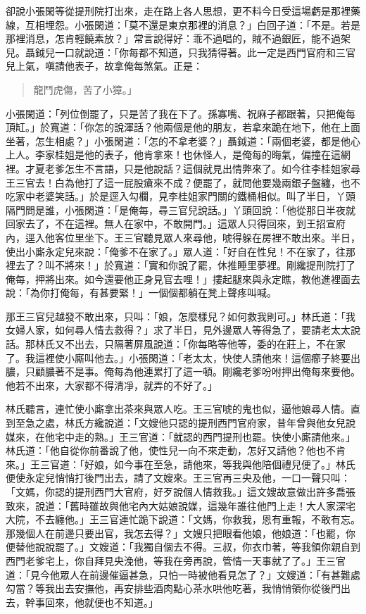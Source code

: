 卻說小張閑等從提刑院打出來，走在路上各人思想，更不料今日受這場虧是那裡藥線，互相埋怨。小張閑道：「莫不還是東京那裡的消息？」白回子道：「不是。若是那裡消息，怎肯輕饒素放？」常言說得好：乖不過唱的，賊不過銀匠，能不過架兒。聶鉞兒一口就說道：「你每都不知道，只我猜得著。此一定是西門官府和三官兒上氣，嗔請他表子，故拿俺每煞氣。正是：
\begin{quote}
龍鬥虎傷，苦了小獐。」
\end{quote}小張閑道：「列位倒罷了，只是苦了我在下了。孫寡嘴、祝麻子都跟著，只把俺每頂缸。」於寬道：「你怎的說渾話？他兩個是他的朋友，若拿來跪在地下，他在上面坐著，怎生相處？」小張閑道：「怎的不拿老婆？」聶鉞道：「兩個老婆，都是他心上人。李家桂姐是他的表子，他肯拿來！也休怪人，是俺每的晦氣，偏撞在這網裡。才夏老爹怎生不言語，只是他說話？這個就見出情弊來了。如今往李桂姐家尋王三官去！白為他打了這一屁股瘡來不成？便罷了，就問他要幾兩銀子盤纏，也不吃家中老婆笑話。」於是逕入勾欄，見李桂姐家門關的鐵桶相似。叫了半日，丫頭隔門問是誰，小張閑道：「是俺每，尋三官兒說話。」丫頭回說：「他從那日半夜就回家去了，不在這裡。無人在家中，不敢開門。」這眾人只得回來，到王招宣府內，逕入他客位里坐下。王三官聽見眾人來尋他，唬得躲在房裡不敢出來。半日，使出小廝永定兒來說：「俺爹不在家了。」眾人道：「好自在性兒！不在家了，往那裡去了？叫不將來！」於寬道：「實和你說了罷，休推睡里夢裡。剛纔提刑院打了俺每，押將出來。如今還要他正身見官去哩！」摟起腿來與永定瞧，教他進裡面去說：「為你打俺每，有甚要緊！」一個個都躺在凳上聲疼叫喊。

那王三官兒越發不敢出來，只叫：「娘，怎麼樣兒？如何救我則可。」林氏道：「我女婦人家，如何尋人情去救得？」求了半日，見外邊眾人等得急了，要請老太太說話。那林氏又不出去，只隔著屏風說道：「你每略等他等，委的在莊上，不在家了。我這裡使小廝叫他去。」小張閑道：「老太太，快使人請他來！這個癤子終要出膿，只顧膿著不是事。俺每為他連累打了這一頓。剛纔老爹吩咐押出俺每來要他。他若不出來，大家都不得清凈，就弄的不好了。」

林氏聽言，連忙使小廝拿出茶來與眾人吃。王三官唬的鬼也似，逼他娘尋人情。直到至急之處，林氏方纔說道：「文嫂他只認的提刑西門官府家，昔年曾與他女兒說媒來，在他宅中走的熟。」王三官道：「就認的西門提刑也罷。快使小廝請他來。」林氏道：「他自從你前番說了他，使性兒一向不來走動，怎好又請他？他也不肯來。」王三官道：「好娘，如今事在至急，請他來，等我與他陪個禮兒便了。」林氏便使永定兒悄悄打後門出去，請了文嫂來。王三官再三央及他，一口一聲只叫：「文媽，你認的提刑西門大官府，好歹說個人情救我。」這文嫂故意做出許多喬張致來，說道：「舊時雖故與他宅內大姑娘說媒，這幾年誰往他門上走！大人家深宅大院，不去纏他。」王三官連忙跪下說道：「文媽，你救我，恩有重報，不敢有忘。那幾個人在前邊只要出官，我怎去得？」文嫂只把眼看他娘，他娘道：「也罷，你便替他說說罷了。」文嫂道：「我獨自個去不得。三叔，你衣巾著，等我領你親自到西門老爹宅上，你自拜見央浼他，等我在旁再說，管情一天事就了了。」王三官道：「見今他眾人在前邊催逼甚急，只怕一時被他看見怎了？」文嫂道：「有甚難處勾當？等我出去安撫他，再安排些酒肉點心茶水哄他吃著，我悄悄領你從後門出去，幹事回來，他就便也不知道。」


